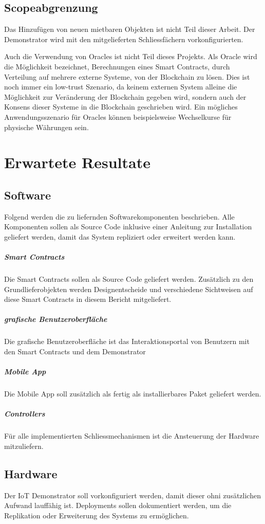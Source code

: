 \subsection{Scopeabgrenzung}
Das Hinzufügen von neuen mietbaren Objekten ist nicht Teil dieser Arbeit. Der Demonstrator wird mit den mitgelieferten Schliessfächern vorkonfigurierten.

Auch die Verwendung von Oracles ist nicht Teil dieses Projekts. Als Oracle wird die Möglichkeit bezeichnet, Berechnungen eines Smart Contracts, durch Verteilung auf mehrere externe Systeme, von der Blockchain zu lösen. Dies ist noch immer ein low-trust Szenario, da keinem externen System alleine die Möglichkeit zur Veränderung der Blockchain gegeben wird, sondern auch der Konsens dieser Systeme in die Blockchain geschrieben wird. Ein mögliches Anwendungsszenario für Oracles können beispielsweise Wechselkurse für physische Währungen sein. \cite{blog.ethereum.org/oracles}

\section{Erwartete Resultate}
\label{sec:Erwartete_Resultate}

\subsection{Software}
Folgend werden die zu liefernden Softwarekomponenten beschrieben. Alle Komponenten sollen als Source Code inklusive einer Anleitung zur Installation geliefert werden, damit das System repliziert oder erweitert werden kann.

\subparagraph{Smart Contracts}
Die Smart Contracts sollen als Source Code geliefert werden. Zusätzlich zu den Grundlieferobjekten werden Designentscheide und verschiedene Sichtweisen auf diese Smart Contracts in diesem Bericht mitgeliefert.

\subparagraph{grafische Benutzeroberfläche}
Die grafische Benutzeroberfläche ist das Interaktionsportal von Benutzern mit den Smart Contracts und dem Demonstrator

\subparagraph{Mobile App}
Die Mobile App soll zusätzlich als fertig als installierbares Paket geliefert werden.

\subparagraph{Controllers}
Für alle implementierten Schliessmechanismen ist die Ansteuerung der Hardware mitzuliefern.

\subsection{Hardware}
Der IoT Demonstrator soll vorkonfiguriert werden, damit dieser ohni zusätzlichen Aufwand lauffähig ist. Deployments sollen dokumentiert werden, um die Replikation oder Erweiterung des Systems zu ermöglichen.